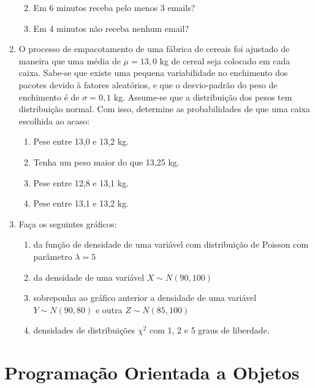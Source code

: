 \documentclass[10pt,a4paper]{book}
\providecommand{\tightlist}{%
  \setlength{\itemsep}{0pt}\setlength{\parskip}{0pt}}
\begin{document}
\begin{enumerate}
  \begin{enumerate}
  \def\labelenumii{\alph{enumii}.}
  \tightlist
  \item
    Em 6 minutos receba pelo menos 3 emails?
  \item
    Em 4 minutos não receba nenhum email?
  \end{enumerate}
\item
  O processo de empacotamento de uma fábrica de cereais foi ajustado de
  maneira que uma média de \(\mu = 13,0\) kg de cereal seja colocado em
  cada caixa. Sabe-se que existe uma pequena variabilidade no enchimento
  dos pacotes devido à fatores aleatórios, e que o desvio-padrão do peso
  de enchimento é de \(\sigma = 0,1\) kg. Assume-se que a distribuição
  dos pesos tem distribuição normal. Com isso, determine as
  probabilidades de que uma caixa escolhida ao acaso:

  \begin{enumerate}
  \def\labelenumii{\alph{enumii}.}
  \tightlist
  \item
    Pese entre 13,0 e 13,2 kg.
  \item
    Tenha um peso maior do que 13,25 kg.
  \item
    Pese entre 12,8 e 13,1 kg.
  \item
    Pese entre 13,1 e 13,2 kg.
  \end{enumerate}
\item
  Faça os seguintes gráficos:

  \begin{enumerate}
  \def\labelenumii{\alph{enumii}.}
  \tightlist
  \item
    da função de densidade de uma variável com distribuição de Poisson
    com parâmetro \(\lambda = 5\)
  \item
    da densidade de uma variável \(X \sim N(90, 100)\)
  \item
    sobreponha ao gráfico anterior a densidade de uma variável
    \(Y \sim N(90, 80)\) e outra \(Z \sim N(85, 100)\)
  \item
    densidades de distribuições \(\chi^2\) com 1, 2 e 5 graus de
    liberdade.
  \end{enumerate}
\end{enumerate}

\appendix


\chapter{Programação Orientada a
Objetos}\label{programacao-orientada-a-objetos}
\end{document}
